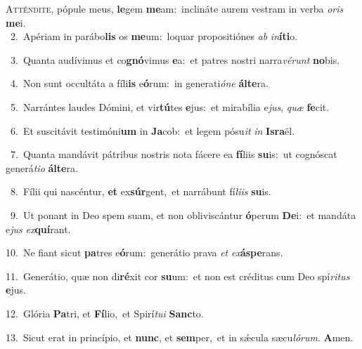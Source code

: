 \lettrine{\initial\textcolor{\initialcolor}{A}}{tténdite,} pópule meus, \textbf{le}\-gem \textbf{me}\-am:~\star inclináte aurem vestram in verba \textit{o}\-\textit{ris} \textbf{me}\-i.\\
{\numbfont\textcolor{\numbcolor}{~2.}}~Apériam in parábo\textbf{lis} os \textbf{me}\-um:~\star loquar propositiónes \textit{ab} \textit{in}\-\textbf{í}\textbf{ti}o.\par
{\numbfont\textcolor{\numbcolor}{~3.}}~Quanta audívimus et co\-\textbf{gnó}\-vimus \textbf{e}\-a:~\star et patres nostri narra\-\textit{vé}\-\textit{runt} \textbf{no}\-bis.\par
{\numbfont\textcolor{\numbcolor}{~4.}}~Non sunt occultáta a fíli\textbf{is} e\-\textbf{ó}\-rum:~\star in generati\-\textit{ó}\-\textit{ne} \textbf{ál}\-\textbf{te}ra.\par
{\numbfont\textcolor{\numbcolor}{~5.}}~Narrántes laudes Dómini, et vir\-\textbf{tú}\-tes \textbf{e}\-jus:~\star et mirabília e\-\textit{jus}\-, \textit{quæ} \textbf{fe}\-cit.\par
{\numbfont\textcolor{\numbcolor}{~6.}}~Et suscitávit testimóni\textbf{um} in \textbf{Ja}\-cob:~\star et legem pósu\textit{it} \textit{in} \textbf{Is}\-\textbf{ra}ël.\par
{\numbfont\textcolor{\numbcolor}{~7.}}~Quanta mandávit pátribus nostris nota fácere ea \textbf{fí}\-liis \textbf{su}\-is:~\star ut cognóscat generá\-\textit{ti}\-\textit{o} \textbf{ál}\-\textbf{te}ra.\par
{\numbfont\textcolor{\numbcolor}{~8.}}~Fílii qui nascéntur, \textbf{et} ex\-\textbf{súr}\-gent,~\star et narrábunt fí\-\textit{li}\-\textit{is} \textbf{su}\-is.\par
{\numbfont\textcolor{\numbcolor}{~9.}}~Ut ponant in Deo spem suam, et non obliviscántur \textbf{ó}\-perum \textbf{De}\-i:~\star et mandáta e\textit{jus} \textit{ex}\-\textbf{quí}rant.\par
{\numbfont\textcolor{\numbcolor}{10.}}~Ne fiant sicut \textbf{pa}\-tres e\-\textbf{ó}\-rum:~\star generátio prava \textit{et} \textit{ex}\-\textbf{ás}\textbf{pe}rans.\par
{\numbfont\textcolor{\numbcolor}{11.}}~Generátio, quæ non di\-\textbf{ré}\-xit cor \textbf{su}\-um:~\star et non est créditus cum Deo spí\-\textit{ri}\-\textit{tus} \textbf{e}\-jus.\par
{\numbfont\textcolor{\numbcolor}{12.}}~Glória \textbf{Pa}\-tri, et \textbf{Fí}\-lio,~\star et Spirí\-\textit{tu}\-\textit{i} \textbf{Sanc}\-to.\par
{\numbfont\textcolor{\numbcolor}{13.}}~Sicut erat in princípio, et \textbf{nunc}\-, et \textbf{sem}\-per,~\star et in sǽcula sæcu\-\textit{ló}\-\textit{rum}. \textbf{A}\-men.\par
